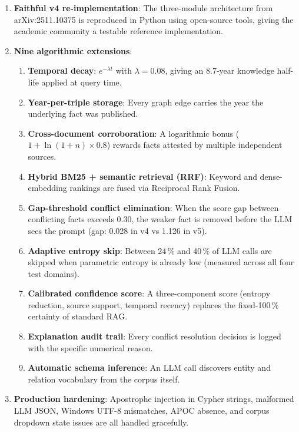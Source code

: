 \begin{enumerate}\itemsep0pt
    \item \textbf{Faithful v4 re-implementation}: The three-module architecture
    from arXiv:2511.10375 is reproduced in Python using open-source tools,
    giving the academic community a testable reference implementation.

    \item \textbf{Nine algorithmic extensions}:
    \begin{enumerate}\itemsep0pt
        \item[\textbf{C1}] \textbf{Temporal decay}: $e^{-\lambda t}$ with
        $\lambda = 0.08$, giving an 8.7-year knowledge half-life applied at query time.
        \item[\textbf{C2}] \textbf{Year-per-triple storage}: Every graph edge
        carries the year the underlying fact was published.
        \item[\textbf{C3}] \textbf{Cross-document corroboration}: A
        logarithmic bonus ($1 + \ln(1+n) \times 0.8$) rewards facts attested
        by multiple independent sources.
        \item[\textbf{C4}] \textbf{Hybrid BM25 + semantic retrieval (RRF)}:
        Keyword and dense-embedding rankings are fused via Reciprocal Rank Fusion.
        \item[\textbf{C5}] \textbf{Gap-threshold conflict elimination}:
        When the score gap between conflicting facts exceeds 0.30, the weaker
        fact is removed before the LLM sees the prompt (gap: 0.028 in v4 vs 1.126 in v5).
        \item[\textbf{C6}] \textbf{Adaptive entropy skip}: Between 24\,\% and
        40\,\% of LLM calls are skipped when parametric entropy is already low
        (measured across all four test domains).
        \item[\textbf{C7}] \textbf{Calibrated confidence score}: A
        three-component score (entropy reduction, source support, temporal
        recency) replaces the fixed-100\,\% certainty of standard RAG.
        \item[\textbf{C8}] \textbf{Explanation audit trail}: Every conflict
        resolution decision is logged with the specific numerical reason.
        \item[\textbf{C9}] \textbf{Automatic schema inference}: An LLM call
        discovers entity and relation vocabulary from the corpus itself.
    \end{enumerate}

    \item \textbf{Production hardening}: Apostrophe injection in Cypher
    strings, malformed LLM JSON, Windows UTF-8 mismatches, APOC absence,
    and corpus dropdown state issues are all handled gracefully.
\end{enumerate}

